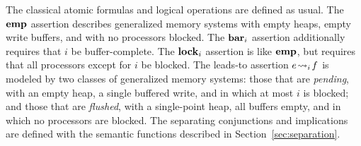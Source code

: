 \documentclass[11pt]{report}         %
\begin{document}
The classical atomic formulas and logical operations are defined as usual. The $\mathbf{emp}$ assertion describes generalized memory systems with empty heaps, empty write buffers, and with no processors blocked. The $\mathbf{bar}_{i}$ assertion additionally requires that $i$ be buffer-complete. The $\mathbf{lock}_{i}$ assertion is like $\mathbf{emp}$, but requires that all processors except for $i$ be blocked. The leads-to assertion $e \!\leadsto_{i}\! f$ is modeled by two classes of generalized memory systems: those that are \emph{pending}, with an empty heap, a single buffered write, and in which at most $i$ is blocked; and those that are \emph{flushed}, with a single-point heap, all buffers empty, and in which no processors are blocked. The separating conjunctions and implications are defined with the semantic functions described in Section~\ref{sec:separation}.  
\end{document}
